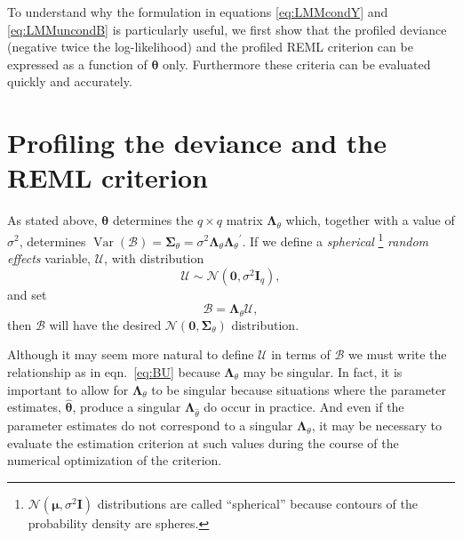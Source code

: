 \documentclass{jss}
\newcommand{\Var}{\operatorname{Var}}
\newcommand{\mc}[1]{\ensuremath{\mathcal{#1}}}
\newcommand{\trans}{\ensuremath{^\prime}}
\newcommand*{\eq}[1]{eqn.~\ref{#1}}%
\begin{document}
To understand why the formulation in equations \ref{eq:LMMcondY} and
\ref{eq:LMMuncondB} is particularly useful, we first show that the
profiled deviance (negative twice the log-likelihood) and the profiled
REML criterion can be expressed as a function of $\bm\theta$ only.
Furthermore these criteria can be evaluated quickly and accurately.

\section{Profiling the deviance and the REML criterion}
\label{sec:profdev}

As stated above, $\bm\theta$ determines the $q\times q$ matrix
$\bm\Lambda_\theta$ which, together with a value of $\sigma^2$,
determines
$\Var(\mc B)=\bm\Sigma_\theta=\sigma^2\bm\Lambda_\theta\bm\Lambda_\theta\trans$.
If we define a \emph{spherical}%
\footnote{$\mathcal{N}(\bm\mu,\sigma^2\bm I)$
  distributions are called ``spherical'' because contours of the
  probability density are spheres.}
\emph{random effects} variable, $\mc U$, with distribution%
\begin{equation}
  \label{eq:sphericalRE}
  \mc U\sim\mathcal{N}(\bm 0,\sigma^2\bm I_q),
\end{equation}%
and set%
\begin{equation}
  \label{eq:BU}
  \mc B=\bm\Lambda_\theta\mc U,
\end{equation}%
then $\mc B$ will have the desired $\mathcal{N}(\bm
0,\bm\Sigma_\theta)$ distribution.

Although it may seem more natural to define $\mc U$ in terms of $\mc
B$ we must write the relationship as in \eq{eq:BU} because
$\bm\Lambda_\theta$ may be singular.  In fact, it is important to
allow for $\bm\Lambda_\theta$ to be singular because situations
where the parameter estimates, $\widehat{\bm\theta}$, produce a
singular $\bm\Lambda_{\widehat{\theta}}$ do occur in practice.  And
even if the parameter estimates do not correspond to a singular
$\bm\Lambda_\theta$, it may be necessary to evaluate the estimation
criterion at such values during the course of the numerical
optimization of the criterion.
\end{document}
